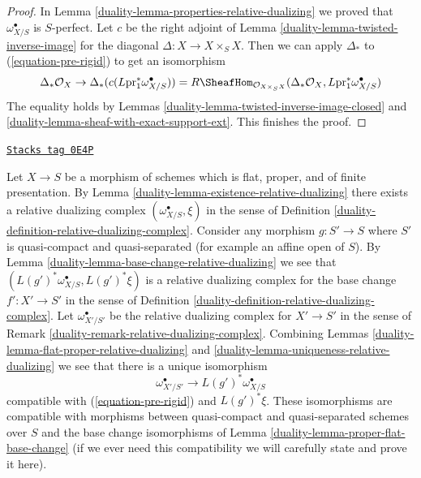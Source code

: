 \begin{proof}

In Lemma \ref{duality-lemma-properties-relative-dualizing} we proved that
$\omega_{X/S}^\bullet$ is $S$-perfect.
Let $c$ be the right adjoint of
Lemma \ref{duality-lemma-twisted-inverse-image}
for the diagonal $\Delta : X \to X \times_S X$.
Then we can apply $\Delta_*$ to (\ref{equation-pre-rigid})
to get an isomorphism
$$
\Delta_*\mathcal{O}_X \to
\Delta_*(c(L\text{pr}_1^*\omega_{X/S}^\bullet)) =
R\SheafHom_{\mathcal{O}_{X \times_S X}}(
\Delta_*\mathcal{O}_X, L\text{pr}_1^*\omega_{X/S}^\bullet)
$$
The equality holds by
Lemmas \ref{duality-lemma-twisted-inverse-image-closed} and
\ref{duality-lemma-sheaf-with-exact-support-ext}.
This finishes the proof.
\end{proof}

\begin{remark}
\label{duality-remark-relative-dualizing-complex-bis}
\href{https://stacks.math.columbia.edu/tag/0E4P}{\texttt{Stacks tag 0E4P}}

Let $X \to S$ be a morphism of schemes which is flat, proper, and
of finite presentation. By Lemma \ref{duality-lemma-existence-relative-dualizing}
there exists a relative dualizing complex $(\omega_{X/S}^\bullet, \xi)$
in the sense of Definition \ref{duality-definition-relative-dualizing-complex}.
Consider any morphism $g : S' \to S$ where $S'$ is quasi-compact and
quasi-separated (for example an affine open of $S$).
By Lemma \ref{duality-lemma-base-change-relative-dualizing}
we see that $(L(g')^*\omega_{X/S}^\bullet, L(g')^*\xi)$ is
a relative dualizing complex for the base change $f' : X' \to S'$
in the sense of Definition \ref{duality-definition-relative-dualizing-complex}.
Let $\omega_{X'/S'}^\bullet$ be the relative dualizing complex
for $X' \to S'$ in the sense of Remark \ref{duality-remark-relative-dualizing-complex}.
Combining Lemmas \ref{duality-lemma-flat-proper-relative-dualizing} and
\ref{duality-lemma-uniqueness-relative-dualizing}
we see that there is a unique isomorphism
$$
\omega_{X'/S'}^\bullet \longrightarrow L(g')^*\omega_{X/S}^\bullet
$$
compatible with (\ref{equation-pre-rigid}) and $L(g')^*\xi$.
These isomorphisms are compatible with morphisms between
quasi-compact and quasi-separated schemes over $S$
and the base change isomorphisms of Lemma \ref{duality-lemma-proper-flat-base-change}
(if we ever need this compatibility we will carefully state and prove
it here).
\end{remark}

